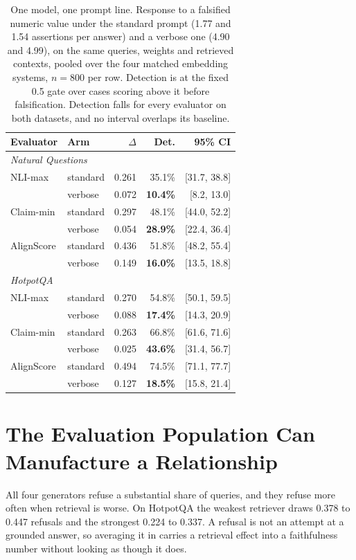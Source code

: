 \documentclass[11pt]{article}
\begin{document}
\begin{table}[t]
\centering\small
\begin{tabular}{llrrr}
\toprule
\textbf{Evaluator} & \textbf{Arm} & $\Delta$ & Det. & 95\% CI \\
\midrule
\multicolumn{5}{l}{\emph{Natural Questions}} \\
NLI-max & standard & 0.261 & 35.1\% & [31.7, 38.8] \\
 & verbose & 0.072 & \textbf{10.4\%} & [8.2, 13.0] \\
Claim-min & standard & 0.297 & 48.1\% & [44.0, 52.2] \\
 & verbose & 0.054 & \textbf{28.9\%} & [22.4, 36.4] \\
AlignScore & standard & 0.436 & 51.8\% & [48.2, 55.4] \\
 & verbose & 0.149 & \textbf{16.0\%} & [13.5, 18.8] \\
\midrule
\multicolumn{5}{l}{\emph{HotpotQA}} \\
NLI-max & standard & 0.270 & 54.8\% & [50.1, 59.5] \\
 & verbose & 0.088 & \textbf{17.4\%} & [14.3, 20.9] \\
Claim-min & standard & 0.263 & 66.8\% & [61.6, 71.6] \\
 & verbose & 0.025 & \textbf{43.6\%} & [31.4, 56.7] \\
AlignScore & standard & 0.494 & 74.5\% & [71.1, 77.7] \\
 & verbose & 0.127 & \textbf{18.5\%} & [15.8, 21.4] \\
\bottomrule
\end{tabular}
\caption{One model, one prompt line. Response to a falsified numeric value under the standard prompt (1.77 and 1.54 assertions per answer) and a verbose one (4.90 and 4.99), on the same queries, weights and retrieved contexts, pooled over the four matched embedding systems, $n = 800$ per row. Detection is at the fixed 0.5 gate over cases scoring above it before falsification. Detection falls for every evaluator on both datasets, and no interval overlaps its baseline.}
\label{tab:verbosity}
\end{table}


\section{The Evaluation Population Can Manufacture a Relationship}
\label{sec:population}

All four generators refuse a substantial share of queries, and they refuse more often when retrieval is worse. On HotpotQA the weakest retriever draws 0.378 to 0.447 refusals and the strongest 0.224 to 0.337. A refusal is not an attempt at a grounded answer, so averaging it in carries a retrieval effect into a faithfulness number without looking as though it does.
\end{document}
